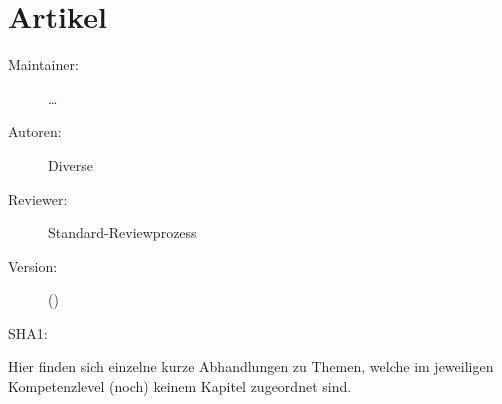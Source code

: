 \def\ChapterCode{EXPERT}
\chapter
[\CO{[EXPERT]} Artikelsammlung]
{Artikel}
\label{chp:EXPERT-Artikelsammlung}

\ChapterIntro
{%

}
{%
\begin{description}
  \item[Maintainer:] \ldots
  \item[Autoren:] Diverse
  \item[Reviewer:] Standard-Reviewprozess
  \item[Version:] {\VarDocVersionTypeName} ({\VarDocVersionTypeDescription})
  \item[SHA1:] {\DocGitCommit}
\end{description}

{\TxTeilkapitelAASS}}

{\sffamily\noindent Hier finden sich einzelne kurze
Abhandlungen zu Themen, welche im jeweiligen Kompetenzlevel
(noch) keinem Kapitel zugeordnet sind.}

\clearpage %


\ChapterEnd